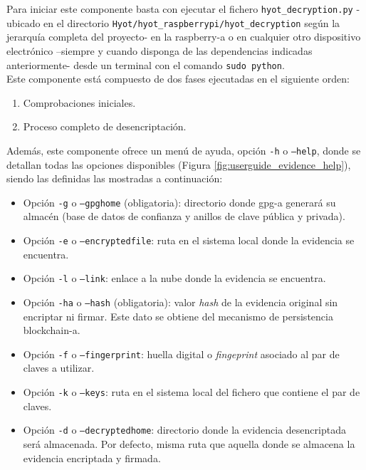 \documentclass[12pt,a4paper, twoside]{report}
\begin{document}
	Para iniciar este componente basta con ejecutar el fichero \texttt{hyot\_decryption.py} -ubicado en el directorio \texttt{Hyot/hyot\_raspberrypi/hyot\_decryption} según la jerarquía completa del proyecto- en la \gls{raspberry-a} o en cualquier otro dispositivo electrónico –siempre y cuando disponga de las dependencias indicadas anteriormente- desde un terminal con el comando \texttt{sudo python}. \\

	Este componente está compuesto de dos fases ejecutadas en el siguiente orden:

	\begin{enumerate}
		\item Comprobaciones iniciales.
		\item Proceso completo de desencriptación.
	\end{enumerate}
	
	Además, este componente ofrece un menú de ayuda, opción \texttt{-h} o \texttt{--help}, donde se detallan todas las opciones disponibles (Figura \ref{fig:userguide_evidence_help}), siendo las definidas las mostradas a continuación:
	
	\begin{itemize}
		\item Opción \texttt{-g} o \texttt{--gpghome} (obligatoria): directorio donde \gls{gpg-a} generará su almacén (base de datos de confianza y anillos de clave pública y privada).
		\item Opción \texttt{-e} o \texttt{--encryptedfile}: ruta en el sistema local donde la evidencia se encuentra.
		\item Opción \texttt{-l} o \texttt{--link}: enlace a la nube donde la evidencia se encuentra.
		\item Opción \texttt{-ha} o \texttt{--hash} (obligatoria): valor \textit{hash} de la evidencia original sin encriptar ni firmar. Este dato se obtiene del mecanismo de persistencia \gls{blockchain-a}.
		\item Opción \texttt{-f} o \texttt{--fingerprint}: huella digital o \textit{fingeprint} asociado al par de claves a utilizar.
		\item Opción \texttt{-k} o \texttt{--keys}: ruta en el sistema local del fichero que contiene el par de claves. 
		\item Opción \texttt{-d} o \texttt{--decryptedhome}: directorio donde la evidencia desencriptada será almacenada. Por defecto, misma ruta que aquella donde se almacena la evidencia encriptada y firmada.
	\end{itemize}
\end{document}
